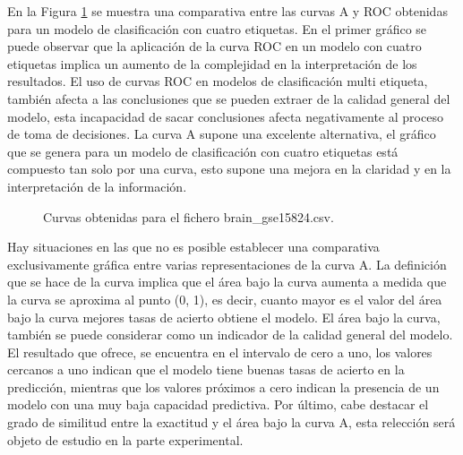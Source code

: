 \bigbreak

En la Figura \ref{fig:2} se muestra una comparativa entre las curvas A y ROC obtenidas para un modelo de clasificación con cuatro etiquetas. En el primer gráfico se puede observar que la aplicación de la curva ROC en un modelo con cuatro etiquetas implica un aumento de la complejidad en la interpretación de los resultados. El uso de curvas ROC en modelos de clasificación multi etiqueta, también afecta a las conclusiones que se pueden extraer de la calidad general del modelo, esta incapacidad de sacar conclusiones afecta negativamente al proceso de toma de decisiones. La curva A supone una excelente alternativa, el gráfico que se genera para un modelo de clasificación con cuatro etiquetas está compuesto tan solo por una curva, esto supone una mejora en la claridad y en la interpretación de la información. 

\bigbreak

\begin{figure}[htp]
    \centering
    \caption{Curvas obtenidas para el fichero brain\_gse15824.csv.}
    \label{fig:2}
\end{figure}

\bigbreak

Hay situaciones en las que no es posible establecer una comparativa exclusivamente gráfica entre varias representaciones de la curva A. La definición que se hace de la curva implica que el área bajo la curva aumenta a medida que la curva se aproxima al punto (0, 1), es decir, cuanto mayor es el valor del área bajo la curva mejores tasas de acierto obtiene el modelo. El área bajo la curva, también se puede considerar como un indicador de la calidad general del modelo. El resultado que ofrece, se encuentra en el intervalo de cero a uno, los valores cercanos a uno indican que el modelo tiene buenas tasas de acierto en la predicción, mientras que los valores próximos a cero indican la presencia de un modelo con una muy baja capacidad predictiva. Por último, cabe destacar el grado de similitud entre la exactitud y el área bajo la curva A, esta relección será objeto de estudio en la parte experimental.

\bigbreak


